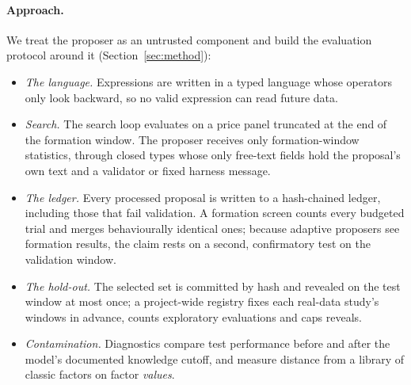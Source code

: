 \paragraph{Approach.} We treat the proposer as an untrusted component and
build the evaluation protocol around it (Section~\ref{sec:method}):
\begin{itemize}
  \item \emph{The language.} Expressions are written in a typed language
    whose operators only look backward, so no valid expression can read
    future data.
  \item \emph{Search.} The search loop evaluates on a price panel truncated
    at the end of the formation window. The proposer receives only
    formation-window statistics, through closed types whose only free-text
    fields hold the proposal's own text and a validator or fixed harness
    message.
  \item \emph{The ledger.} Every processed proposal is written to a
    hash-chained ledger, including those that fail validation. A formation
    screen counts every budgeted trial and merges behaviourally identical
    ones; because adaptive proposers see formation results, the claim rests
    on a second, confirmatory test on the validation window.
  \item \emph{The hold-out.} The selected set is committed by hash and
    revealed on the test window at most once; a project-wide registry fixes
    each real-data study's windows in advance, counts exploratory
    evaluations and caps reveals.
  \item \emph{Contamination.} Diagnostics compare test performance before and
    after the model's documented knowledge cutoff, and measure distance from
    a library of classic factors on factor \emph{values}.
\end{itemize}

